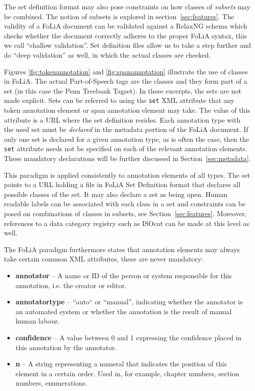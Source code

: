 \documentclass[a4paper,10pt,twoside]{article}
\begin{document}
The set definition format may also pose constraints on how classes of
\emph{subsets} may be combined. The notion of subsets is explored in 
section~\ref{sec:features}. The validity of a FoLiA document can be validated
against a RelaxNG schema which checks whether the document correctly adheres to
the proper FoLiA syntax, this we call ``shallow validation''. Set definition
files allow us to take a step further and do ``deep validation'' as well, in
which the actual classes are checked.

Figures
\ref{fig:tokenannotation} and \ref{fig:spanannotation} illustrate the use of
classes in FoLiA. The actual Part-of-Speech tags are the classes and they form part of a
set (in this case the Penn Treebank Tagset). In these excerpts, the sets are
not made explicit. Sets can be referred to using the \texttt{set} XML attribute
that any token annotation element or span annotation element may take. The
value of this attribute is a URL where the set definition resides. Each
annotation type with the used set must be \emph{declared} in the metadata portion of
the FoLiA document. If only one set is declared for a given annotation type, as
is often the case, then the \texttt{set} attribute needs not be specified on
each of the relevant annotation elements. These mandatory declarations will be
further discussed in Section~\ref{sec:metadata}. 

This paradigm is applied consistently to annotation elements of all types. The
set points to a URL holding a file in FoLiA Set Definition format that
declares all possible classes of the set. It may also declare a set as being
open. Human readable labels can be associated with each class in a set and
constraints can be posed on combinations of classes in subsets, see
Section~\ref{sec:features}. Moreover, references to a data category registry
such as ISOcat \cite{ISOCAT} can be made at this level as well.

The FoLiA paradigm furthermore states that annotation elements may always take certain
common XML attributes, these are never mandatory:

\begin{itemize}
\item \textbf{annotator} -- A name or ID of the person or system responsible for this annotation, i.e. the creator or editor.
\item \textbf{annotatortype} -- ``auto`` or ``manual'', indicating whether the annotator is an automated system or whether the annotation is the result of manual human labour.
\item \textbf{confidence} -- A value between 0 and 1 expressing the confidence placed in this annotation by the annotator.
\item \textbf{n} -- A string representing a numeral that indicates the position
  of this element in a certain order. Used in, for example, chapter numbers, section numbers, enumerations.
\end{itemize}
\end{document}
